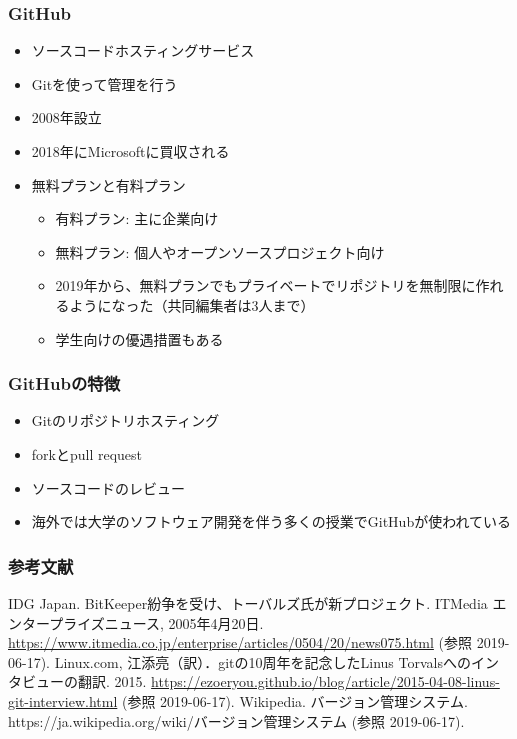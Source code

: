 \documentclass[dvipdfmx]{beamer}
\begin{document}
\begin{frame}
    \frametitle{GitHub}
    \large
    \begin{itemize}
        \item ソースコードホスティングサービス
        \item Gitを使って管理を行う
        \item 2008年設立
        \item 2018年にMicrosoftに買収される
        \item 無料プランと有料プラン
        \begin{itemize}
            \item 有料プラン: 主に企業向け
            \item 無料プラン: 個人やオープンソースプロジェクト向け
            \item 2019年から、無料プランでもプライベートでリポジトリを無制限に作れるようになった（共同編集者は3人まで）
            \item 学生向けの優遇措置もある
        \end{itemize}
    \end{itemize}
\end{frame}

\begin{frame}
    \frametitle{GitHubの特徴}
    \large
    \begin{itemize}
        \item Gitのリポジトリホスティング
        \item forkとpull request
        \item ソースコードのレビュー
        \item 海外では大学のソフトウェア開発を伴う多くの授業でGitHubが使われている
    \end{itemize}
\end{frame}

\begin{frame}
    \frametitle{参考文献}
    \begin{thebibliography}{99}
         IDG Japan. BitKeeper紛争を受け、トーバルズ氏が新プロジェクト. ITMedia エンタープライズニュース, 2005年4月20日. \url{https://www.itmedia.co.jp/enterprise/articles/0504/20/news075.html} (参照 2019-06-17).
         Linux.com, 江添亮（訳）．gitの10周年を記念したLinus Torvalsへのインタビューの翻訳. 2015. \url{https://ezoeryou.github.io/blog/article/2015-04-08-linus-git-interview.html} (参照 2019-06-17).
         Wikipedia. バージョン管理システム. https://ja.wikipedia.org/wiki/バージョン管理システム (参照 2019-06-17).
    \end{thebibliography}    
\end{frame}
\end{document}
